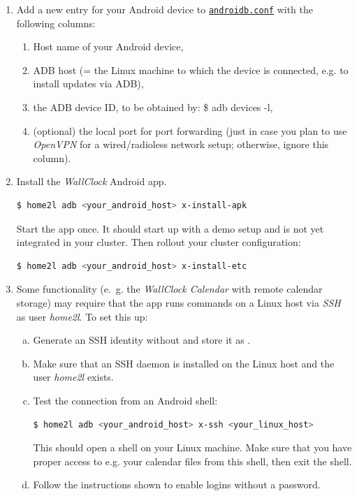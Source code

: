\documentclass[12pt,english,parskip=half,headheight=19pt]{scrreprt}
\newcommand{\lstf}[1]{\colorbox{lstbackground}{\ttfamily\footnotesize#1}}
\newcommand{\idx}[1]{#1\index{#1}}
\newcommand{\reftool}[1]{\hyperref[tool:#1]{\texttt{\idx{#1}}}}
\begin{document}
\begin{enumerate}
  \item Add a new entry for your Android device to \reftool{androidb.conf} with the following columns:
    \begin{enumerate}
      \item Host name of your Android device,
      \item ADB host (= the Linux machine to which the device is connected, e.g. to install updates via ADB),
      \item the ADB device ID, to be obtained by: \lstf{\$ adb devices -l},
      \item (optional) the local port for port forwarding (just in case you plan to use \textit{OpenVPN} for a wired/radioless network setup; otherwise, ignore this column).
    \end{enumerate}

  \item Install the \textit{WallClock} Android app.
    \begin{lstlisting}[language=bash]
      $ home2l adb <your_android_host> x-install-apk
    \end{lstlisting}
    Start the app once. It should start up with a demo setup and is not yet integrated in your cluster.
    Then rollout your cluster configuration:
    \begin{lstlisting}[language=bash]
      $ home2l adb <your_android_host> x-install-etc
    \end{lstlisting}

  \item Some functionality (e.~g. the \textit{WallClock Calendar} with remote calendar storage) may
        require that the app runs commands on a Linux host via \textit{SSH} as user \textit{home2l}.
        To set this up:
    \begin{enumerate}[a)]
      \item Generate an SSH identity without and store it as
            .
      \item Make sure that an SSH daemon is installed on the Linux host and the user \textit{home2l} exists.
      \item Test the connection from an Android shell:
        \begin{lstlisting}[language=bash]
          $ home2l adb <your_android_host> x-ssh <your_linux_host>
        \end{lstlisting}
        This should open a shell on your Linux machine. Make sure that you have proper access
        to e.g. your calendar files from this shell, then exit the shell.
      \item Follow the instructions shown to enable logins without a password.
    \end{enumerate}
\end{enumerate}
\end{document}
